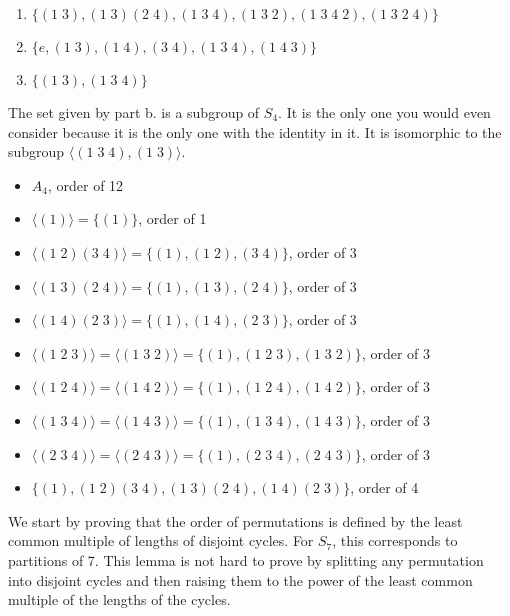 \documentclass[12pt]{report}
\begin{document}
\begin{enumerate}[label=\alph*.]
    \item $\{(1 \; 3), (1 \; 3)(2 \; 4), (1 \; 3 \; 4), (1 \; 3 \; 2), (1 \; 3 \; 4 \; 2), (1 \; 3 \; 2 \; 4)\}$
    \item $\{e, (1 \; 3), (1\; 4), (3\; 4), (1 \; 3 \; 4), (1 \; 4 \; 3)\}$
    \item $\{(1 \; 3), (1 \; 3 \; 4)\}$
\end{enumerate}

The set given by part b. is a subgroup of $S_4$. It is the only one you would even consider because it is the only one with the identity in it. It is  isomorphic to the subgroup $\langle (1 \; 3 \; 4), (1 \; 3) \rangle$.

\sol 
\begin{itemize}
    \item $A_4$, order of 12
    \item $\langle (1) \rangle = \{(1)\}$, order of 1
    \item $\langle (1 \; 2)(3 \; 4) \rangle = \{(1), (1 \; 2), (3 \; 4)\}$, order of 3
    \item $\langle (1 \; 3)(2 \; 4) \rangle = \{(1), (1 \; 3), (2 \; 4)\}$, order of 3
    \item $\langle (1 \; 4)(2 \; 3) \rangle = \{(1), (1 \; 4), (2 \; 3)\}$, order of 3
    \item $\langle (1 \; 2 \; 3) \rangle = \langle (1 \; 3 \; 2) \rangle = \{(1), (1 \; 2 \; 3), (1 \; 3 \; 2)\}$, order of 3
    \item $\langle (1 \; 2 \; 4) \rangle = \langle (1 \; 4 \; 2) \rangle = \{(1), (1 \; 2 \; 4), (1 \; 4 \; 2)\}$, order of 3
    \item $\langle (1 \; 3 \; 4) \rangle = \langle (1 \; 4 \; 3) \rangle = \{(1), (1 \; 3 \; 4), (1 \; 4 \; 3)\}$, order of 3
    \item $\langle (2 \; 3 \; 4) \rangle = \langle (2 \; 4 \; 3) \rangle = \{(1), (2 \; 3 \; 4), (2 \; 4 \; 3)\}$, order of 3
    \item $\{(1), (1 \; 2)(3 \; 4), (1 \; 3) (2 \; 4), (1 \; 4)(2 \; 3)\}$, order of 4
\end{itemize}

\sol We start by proving that the order of permutations is defined by the least common multiple of lengths of disjoint cycles. For $S_7$, this corresponds to partitions of 7. This lemma is not hard to prove by splitting any permutation into disjoint cycles and then raising them to the power of the least common multiple of the lengths of the cycles.
\end{document}
